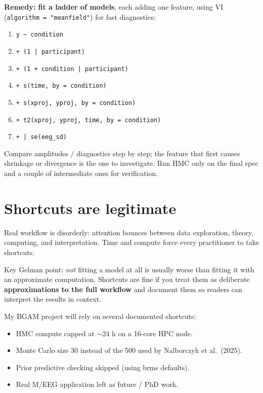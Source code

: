 \documentclass[11pt,a4paper]{article}
\begin{document}
\textbf{Remedy: fit a ladder of models}, each adding one feature,
using VI (\texttt{algorithm = "meanfield"}) for fast diagnostics:

\begin{enumerate}\setlength{\itemsep}{0pt}
    \item \texttt{y \textasciitilde\ condition}
    \item \texttt{+ (1 | participant)}
    \item \texttt{+ (1 + condition | participant)}
    \item \texttt{+ s(time, by = condition)}
    \item \texttt{+ s(xproj, yproj, by = condition)}
    \item \texttt{+ t2(xproj, yproj, time, by = condition)}
    \item \texttt{+ | se(eeg\_sd)}
\end{enumerate}

\noindent Compare amplitudes / diagnostics step by step; the feature
that first causes shrinkage or divergence is the one to investigate.
Run HMC only on the final spec and a couple of intermediate ones for
verification.

\section*{Shortcuts are legitimate}

Real workflow is disorderly: attention bounces between data exploration,
theory, computing, and interpretation. Time and compute force every
practitioner to take shortcuts.

Key Gelman point: \emph{not} fitting a model at all is usually worse
than fitting it with an approximate computation. Shortcuts are fine
if you treat them as deliberate \textbf{approximations to the full
workflow} and document them so readers can interpret the results in
context.

\medskip
\noindent My BGAM project will rely on several documented shortcuts:
\begin{itemize}\setlength{\itemsep}{0pt}
    \item HMC compute capped at $\sim$24 h on a 16-core HPC node.
    \item Monte Carlo size 30 instead of the 500 used by Nalborczyk
          et al.\ (2025).
    \item Prior predictive checking skipped (using brms defaults).
    \item Real M/EEG application left as future / PhD work.
\end{itemize}
\end{document}
